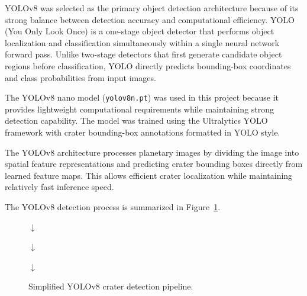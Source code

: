 \documentclass[conference]{IEEEtran}
\begin{document}
	YOLOv8 was selected as the primary object detection architecture because of its strong balance between detection accuracy and computational efficiency. YOLO (You Only Look Once) is a one-stage object detector that performs object localization and classification simultaneously within a single neural network forward pass. Unlike two-stage detectors that first generate candidate object regions before classification, YOLO directly predicts bounding-box coordinates and class probabilities from input images.
	
	The YOLOv8 nano model (\texttt{yolov8n.pt}) was used in this project because it provides lightweight computational requirements while maintaining strong detection capability. The model was trained using the Ultralytics YOLO framework with crater bounding-box annotations formatted in YOLO style.
	
	The YOLOv8 architecture processes planetary images by dividing the image into spatial feature representations and predicting crater bounding boxes directly from learned feature maps. This allows efficient crater localization while maintaining relatively fast inference speed.
	
	The YOLOv8 detection process is summarized in Figure~\ref{fig:yolo_pipeline}.
	
	\begin{figure}[h]
		\centering
		
		
		\vspace{0.15cm}
		
		$\downarrow$
		
		\vspace{0.15cm}
		
		
		\vspace{0.15cm}
		
		$\downarrow$
		
		\vspace{0.15cm}
		
		
		\vspace{0.15cm}
		
		$\downarrow$
		
		\vspace{0.15cm}
		
		
		\caption{Simplified YOLOv8 crater detection pipeline.}
		\label{fig:yolo_pipeline}
		
	\end{figure}
	
\end{document}
